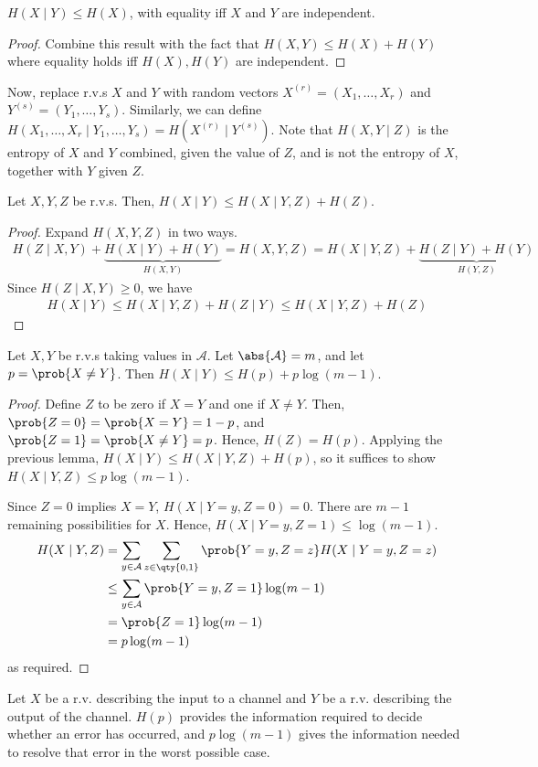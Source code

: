 \begin{corollary}
    $H(X\mid Y) \leq H(X)$, with equality iff $X$ and $Y$ are independent.
\end{corollary}
\begin{proof}
    Combine this result with the fact that $H(X,Y) \leq H(X) + H(Y)$ where equality holds iff $H(X), H(Y)$ are independent.
\end{proof}
Now, replace r.v.s $X$ and $Y$ with random vectors $X^{(r)} = (X_1, \dots, X_r)$ and $Y^{(s)} = (Y_1, \dots, Y_s)$.
Similarly, we can define $H(X_1, \dots, X_r \mid Y_1, \dots, Y_s) = H(X^{(r)} \mid Y^{(s)})$.
Note that $H(X,Y\mid Z)$ is the entropy of $X$ and $Y$ combined, given the value of $Z$, and is not the entropy of $X$, together with $Y$ given $Z$.
\begin{lemma}
    Let $X, Y, Z$ be r.v.s.
    Then, $H(X \mid Y) \leq H(X \mid Y, Z) + H(Z)$.
\end{lemma}
\begin{proof}
    Expand $H(X,Y,Z)$ in two ways.
    \begin{align*}
        H(Z \mid X,Y) + \underbrace{H(X\mid Y) + H(Y)}_{H(X,Y)} = H(X,Y,Z) = H(X \mid Y,Z) + \underbrace{H(Z \mid Y) + H(Y)}_{H(Y,Z)}
    \end{align*}
    Since $H(Z \mid X,Y) \geq 0$, we have
    \begin{align*}
        H(X \mid Y) \leq H(X \mid Y,Z) + H(Z \mid Y) \leq H(X \mid Y,Z) + H(Z)
    \end{align*}
\end{proof}
\begin{proposition}
    Let $X, Y$ be r.v.s taking values in $\mathcal A$.
    Let $\abs{\mathcal A} = m$, and let $p = \prob{X \neq Y}$.
    Then $H(X \mid Y) \leq H(p) + p \log(m-1)$.
\end{proposition}
\begin{proof}
    Define $Z$ to be zero if $X = Y$ and one if $X \neq Y$.
    Then, $\prob{Z = 0} = \prob{X = Y} = 1 - p$, and $\prob{Z = 1} = \prob{X \neq Y} = p$.
    Hence, $H(Z) = H(p)$.
    Applying the previous lemma, $H(X \mid Y) \leq H(X \mid Y, Z) + H(p)$, so it suffices to show $H(X \mid Y, Z) \leq p\log(m-1)$.

    Since $Z = 0$ implies $X = Y$, $H(X \mid Y = y, Z = 0) = 0$.
    There are $m - 1$ remaining possibilities for $X$.
    Hence, $H(X \mid Y = y, Z = 1) \leq \log(m-1)$.
    \begin{align*}
        H(X \mid Y, Z) &= \sum_{y \in \mathcal A} \sum_{z \in \qty{0,1}} \prob{Y = y, Z = z} H(X \mid Y = y, Z = z) \\
        &\leq \sum_{y \in \mathcal A} \prob{Y = y, Z = 1} \log(m-1) \\
        &= \prob{Z = 1} \log (m-1) \\
        &= p\log(m-1)
    \end{align*}
    as required.
\end{proof}
Let $X$ be a r.v. describing the input to a channel and $Y$ be a r.v. describing the output of the channel.
$H(p)$ provides the information required to decide whether an error has occurred, and $p\log(m-1)$ gives the information needed to resolve that error in the worst possible case.

